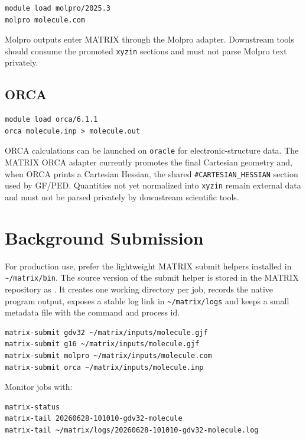 \documentclass[11pt]{article}
\newcommand{\host}{\texttt{oracle}}
\newcommand{\xyzin}{\texttt{xyzin}}
\begin{document}
\begin{lstlisting}[style=matrix]
module load molpro/2025.3
molpro molecule.com
\end{lstlisting}

Molpro outputs enter MATRIX through the Molpro adapter.  Downstream tools
should consume the promoted \xyzin{} sections and must not parse Molpro text
privately.

\subsection{ORCA}

\begin{lstlisting}[style=matrix]
module load orca/6.1.1
orca molecule.inp > molecule.out
\end{lstlisting}

ORCA calculations can be launched on \host{} for electronic-structure data.
The MATRIX ORCA adapter currently promotes the final Cartesian geometry and,
when ORCA prints a Cartesian Hessian, the shared
\texttt{\#CARTESIAN\_HESSIAN} section used by GF/PED.  Quantities not yet
normalized into \xyzin{} remain external data and must not be parsed privately
by downstream scientific tools.

\section{Background Submission}

For production use, prefer the lightweight MATRIX submit helpers installed in
\texttt{\textasciitilde/matrix/bin}.  The source version of the submit helper
is stored in the MATRIX repository as
.  It creates one working
directory per job, records the native program output, exposes a stable log
link in \texttt{\textasciitilde/matrix/logs} and keeps a small metadata file
with the command and process id.

\begin{lstlisting}[style=matrix]
matrix-submit gdv32 ~/matrix/inputs/molecule.gjf
matrix-submit g16 ~/matrix/inputs/molecule.gjf
matrix-submit molpro ~/matrix/inputs/molecule.com
matrix-submit orca ~/matrix/inputs/molecule.inp
\end{lstlisting}

Monitor jobs with:

\begin{lstlisting}[style=matrix]
matrix-status
matrix-tail 20260628-101010-gdv32-molecule
matrix-tail ~/matrix/logs/20260628-101010-gdv32-molecule.log
\end{lstlisting}
\end{document}
